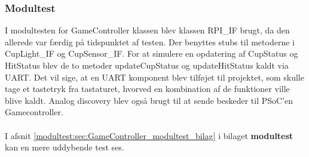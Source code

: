 \documentclass[Rapport/Playerside/GameController/GameController.tex]{subfiles}
\begin{document}
\subsubsection{Modultest}
I modultesten for GameController klassen blev klassen RPI\_IF brugt, da den allerede var færdig på tidspunktet af testen. Der benyttes stubs til metoderne i CupLight\_IF og CupSensor\_IF. For at simulere en opdatering af CupStatus og HitStatus blev de to metoder updateCupStatus og updateHitStatus kaldt via UART. Det vil sige, at en UART komponent blev tilføjet til projektet, som skulle tage et tastetryk fra tastaturet, hvorved en kombination af de funktioner ville blive kaldt. Analog discovery blev også brugt til at sende beskeder til PSoC'en Gamecontroller. \\\\
I afsnit \ref{modultest:sec:GameController_modultest_bilag} i bilaget \textbf{modultest}  kan en mere uddybende test ses.
\end{document}
